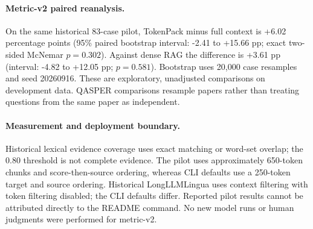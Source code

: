 \documentclass[conference]{IEEEtran}
\begin{document}
\paragraph{Metric-v2 paired reanalysis.} On the same historical 83-case pilot, TokenPack minus full context is +6.02 percentage points (95\% paired bootstrap interval: -2.41 to +15.66 pp; exact two-sided McNemar $p=0.302$). Against dense RAG the difference is +3.61 pp (interval: -4.82 to +12.05 pp; $p=0.581$). Bootstrap uses 20,000 case resamples and seed 20260916. These are exploratory, unadjusted comparisons on development data. QASPER comparisons resample papers rather than treating questions from the same paper as independent.

\paragraph{Measurement and deployment boundary.} Historical lexical evidence coverage uses exact matching or word-set overlap; the 0.80 threshold is not complete evidence. The pilot uses approximately 650-token chunks and score-then-source ordering, whereas CLI defaults use a 250-token target and source ordering. Historical LongLLMLingua uses context filtering with token filtering disabled; the CLI defaults differ. Reported pilot results cannot be attributed directly to the README command. No new model runs or human judgments were performed for metric-v2.
\end{document}
